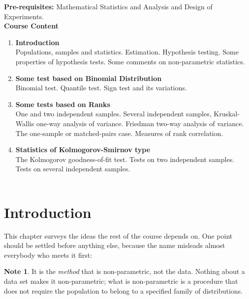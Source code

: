 \documentclass[11pt,a4paper]{article}
\theoremstyle{definition}
\newtheorem{note}[thm]{Note}
\begin{document}
\textbf{Pre-requisites:} Mathematical Statistics and Analysis and Design of Experiments.\\







\pagebreak
\textbf{Course Content}
\hrulefill\\
\begin{enumerate}
\item \textbf{Introduction}\\ 
Populations, samples and statistics. Estimation. Hypothesis testing. Some properties of hypothesis tests. Some comments on non-parametric statistics.
\item \textbf{Some test based on Binomial Distribution}\\ 
Binomial test. Quantile test. Sign test and its variations.
\item \textbf{Some tests based on Ranks}\\ 
One and two independent samples. Several independent samples, Kruskal-Wallis one-way analysis of variance. Friedman two-way analysis of variance. The one-sample or matched-pairs case. Measures of rank correlation.
\item \textbf{Statistics of Kolmogorov-Smirnov type}\\ 
The Kolmogorov goodness-of-fit test. Tests on two independent samples. Tests on several independent samples.\\\\
\end{enumerate}










\pagebreak

\section{Introduction}

This chapter surveys the ideas the rest of the course depends on. One point should
be settled before anything else, because the name misleads almost everybody who
meets it first:

\begin{note}
It is the \emph{method} that is non-parametric, not the data. Nothing about a data
set makes it non-parametric; what is non-parametric is a procedure that does not
require the population to belong to a specified family of distributions.
\end{note}
\end{document}
